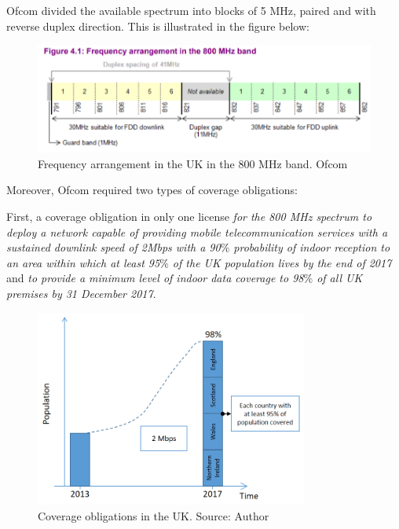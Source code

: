 Ofcom divided the available spectrum into blocks of 5 MHz, paired and with reverse duplex direction. This is illustrated in the figure below:




\begin{figure}[H]
	\begin{Center}
		\includegraphics[width=1.00\textwidth]{./media/image10.png}
		\caption{Frequency arrangement in the UK in the 800 MHz band. Ofcom\cite{2-13}}
	\end{Center}
\end{figure}



Moreover, Ofcom required two types of coverage obligations:\par

First, a coverage obligation in only one license \textit{\guillemotleft for the 800 MHz spectrum to deploy a network capable of providing mobile telecommunication services with a sustained downlink speed of 2Mbps with a 90$\%$  probability of indoor reception to an area within which at least 95$\%$  of the UK population lives by the end of 2017\guillemotright } and\textit{ \guillemotleft to provide a minimum level of indoor data coverage to 98$\%$  of all UK premises by 31 December 2017\guillemotright }.




\begin{figure}[H]
	\begin{Center}
		\includegraphics[width=0.80\textwidth]{./media/image11.png}
		\caption{Coverage obligations in the UK. Source: Author}
	\end{Center}
\end{figure}


